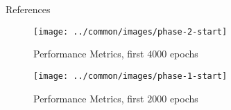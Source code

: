 \appendix
\begin{frame}[allowframebreaks]{References}
    \renewcommand*{\bibfont}{\scriptsize}
    \printbibliography
\end{frame}

\begin{frame}
   \begin{figure}
        \texttt{[image: ../common/images/phase-2-start]}
        \label{fig:phase22}
        \caption{Performance Metrics, first $4000$ epochs}
    \end{figure}
\end{frame}
\begin{frame}
    \begin{figure}
        \texttt{[image: ../common/images/phase-1-start]}
        \label{fig:phase11}
        \caption{Performance Metrics, first $2000$ epochs}
    \end{figure}
\end{frame}
